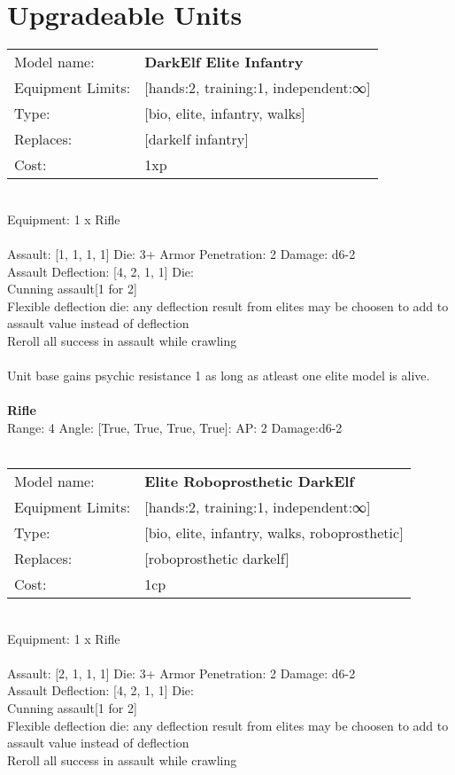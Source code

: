 \pagebreak\section{Upgradeable Units}\noindent
\begin{tabular}{ll}
Model name: &{\bf DarkElf Elite Infantry } \\
Equipment Limits: &[hands:2, training:1, independent:∞] \\
Type: &[bio, elite, infantry, walks] \\
Replaces: &[darkelf infantry] \\
Cost: & 1xp\\
\end{tabular}
\ \\
Equipment: 1 x Rifle \\
\ \\
Assault: [1, 1, 1, 1] Die: 3+ Armor Penetration: 2 Damage: d6-2 \\
Assault Deflection: [4, 2, 1, 1] Die: \\
\indent Cunning assault[1 for 2]\\ 
Flexible deflection die: any deflection result from elites may be choosen to add to assault value instead of deflection\\ 
Reroll all success in assault while crawling\\ 
 
\ \\
Unit base gains psychic resistance 1 as long as atleast one elite model is alive.\\ 

\ \\
{\bf Rifle } \\



Range: 4  Angle: [True, True, True, True]: AP: 2 Damage:d6-2 \\




 
\ \\

\noindent
\begin{tabular}{ll}
Model name: &{\bf Elite Roboprosthetic DarkElf } \\
Equipment Limits: &[hands:2, training:1, independent:∞] \\
Type: &[bio, elite, infantry, walks, roboprosthetic] \\
Replaces: &[roboprosthetic darkelf] \\
Cost: & 1cp\\
\end{tabular}
\ \\
Equipment: 1 x Rifle \\
\ \\
Assault: [2, 1, 1, 1] Die: 3+ Armor Penetration: 2 Damage: d6-2 \\
Assault Deflection: [4, 2, 1, 1] Die: \\
\indent Cunning assault[1 for 2]\\ 
Flexible deflection die: any deflection result from elites may be choosen to add to assault value instead of deflection\\ 
Reroll all success in assault while crawling\\ 
 
